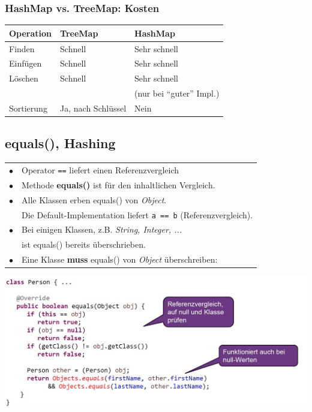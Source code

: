 {    \subsubsection{HashMap vs. TreeMap: Kosten}
        \begin{tabular}{l l l} \hline
            \textbf{Operation} & \textbf{TreeMap} & \textbf{HashMap }\\ \hline
            Finden      & \color{yellow!75!red} Schnell             & \color{green!80!black}Sehr schnell \\
            Einfügen    & \color{yellow!75!red} Schnell             & \color{green!80!black}Sehr schnell \\
            Löschen     & \color{yellow!75!red} Schnell             & \color{green!80!black}Sehr schnell \\
                        &                                           & \color{green!80!black}(nur bei ``guter'' Impl.) \\
            Sortierung  & \color{green!80!black} Ja, nach Schlüssel & \color{red}Nein\\
        \end{tabular}
        \vspace{-0.1cm}

\subsection{equals(), Hashing}
    \begin{tabular}{ll}
        $\bullet$ & Operator \verb|==| liefert einen Referenzvergleich\\
        $\bullet$ & Methode \textbf{equals()} ist für den inhaltlichen Vergleich.\\
        $\bullet$ & Alle Klassen erben equals() von \textit{Object}.\\
                  & Die Default-Implementation liefert \verb|a == b| (Referenzvergleich).\\
        $\bullet$ & Bei einigen Klassen, z.B. \textit{String, Integer, ...} \\
                  & ist equals() bereits überschrieben.\\
        $\bullet$ & Eine Klasse \textbf{muss} equals() von \textit{Object} überschreiben:\\
    \end{tabular}

    \includegraphics[width=\linewidth]{pictures/equals-impl.jpg}
    \vspace{-0.1cm}

}
